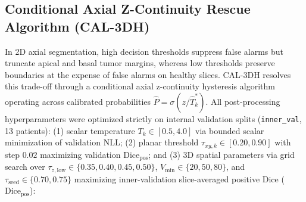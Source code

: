 \documentclass[11pt,a4paper]{article}
\begin{document}
\subsection{Conditional Axial Z-Continuity Rescue Algorithm (CAL-3DH)}\label{sec:calibration_hysteresis}
In 2D axial segmentation, high decision thresholds suppress false alarms but truncate apical and basal tumor margins, whereas low thresholds preserve boundaries at the expense of false alarms on healthy slices. CAL-3DH resolves this trade-off through a conditional axial z-continuity hysteresis algorithm operating across calibrated probabilities $\hat{P} = \sigma(z / \hat{T}_k^*)$. All post-processing hyperparameters were optimized strictly on internal validation splits (\texttt{inner\_val}, 13 patients): (1) scalar temperature $T_k \in [0.5, 4.0]$ via bounded scalar minimization of validation NLL; (2) planar threshold $\tau_{xy,k} \in [0.20, 0.90]$ with step $0.02$ maximizing validation $\text{Dice}_{\text{pos}}$; and (3) 3D spatial parameters via grid search over $\tau_{z,\mathrm{low}} \in \{0.35, 0.40, 0.45, 0.50\}$, $V_{\min} \in \{20, 50, 80\}$, and $\tau_{\mathrm{seed}} \in \{0.70, 0.75\}$ maximizing inner-validation slice-averaged positive Dice ($\text{Dice}_{\text{pos}}$):
\end{document}
